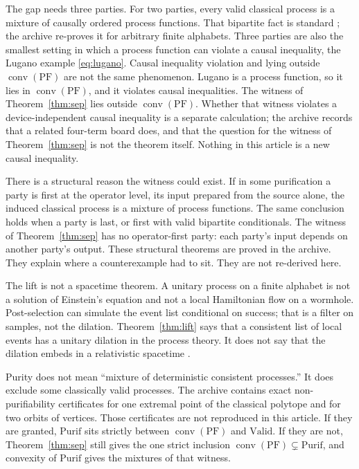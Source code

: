 \documentclass[11pt]{article}
\theoremstyle{definition}
\theoremstyle{remark}
\newcommand{\conv}{\operatorname{conv}}
\newcommand{\PF}{\mathrm{PF}}
\newcommand{\Purif}{\mathrm{Purif}}
\newcommand{\Valid}{\mathrm{Valid}}
\begin{document}
The gap needs three parties. For two parties, every valid classical process is a mixture of causally ordered process functions. That bipartite fact is standard \cite{oreshkov2012,baumann2016}; the archive re-proves it for arbitrary finite alphabets. Three parties are also the smallest setting in which a process function can violate a causal inequality, the Lugano example \eqref{eq:lugano}. Causal inequality violation and lying outside \(\conv(\PF)\) are not the same phenomenon. Lugano is a process function, so it lies in \(\conv(\PF)\), and it violates causal inequalities. The witness of Theorem~\ref{thm:sep} lies outside \(\conv(\PF)\). Whether that witness violates a device-independent causal inequality is a separate calculation; the archive records that a related four-term board does, and that the question for the witness of Theorem~\ref{thm:sep} is not the theorem itself. Nothing in this article is a new causal inequality.

There is a structural reason the witness could exist. If in some purification a party is first at the operator level, its input prepared from the source alone, the induced classical process is a mixture of process functions. The same conclusion holds when a party is last, or first with valid bipartite conditionals. The witness of Theorem~\ref{thm:sep} has no operator-first party: each party's input depends on another party's output. These structural theorems are proved in the archive. They explain where a counterexample had to sit. They are not re-derived here.

The lift is not a spacetime theorem. A unitary process on a finite alphabet is not a solution of Einstein's equation and not a local Hamiltonian flow on a wormhole. Post-selection can simulate the event list conditional on success; that is a filter on samples, not the dilation. Theorem~\ref{thm:lift} says that a consistent list of local events has a unitary dilation in the process theory. It does not say that the dilation embeds in a relativistic spacetime \cite{vilasini2024}.

Purity does not mean ``mixture of deterministic consistent processes.'' It does exclude some classically valid processes. The archive contains exact non-purifiability certificates for one extremal point of the classical polytope and for two orbits of vertices. Those certificates are not reproduced in this article. If they are granted, \(\Purif\) sits strictly between \(\conv(\PF)\) and \(\Valid\). If they are not, Theorem~\ref{thm:sep} still gives the one strict inclusion \(\conv(\PF)\subsetneq\Purif\), and convexity of \(\Purif\) gives the mixtures of that witness.
\end{document}
